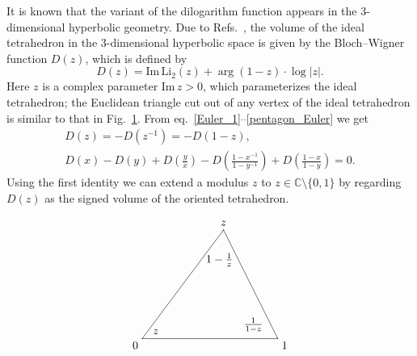 \documentclass[12pt]{article}
\numberwithin{equation}{section}
\renewcommand{\Im}{\text{Im}}
\newcommand{\Li}{\mathrm{Li}_2}
\begin{document}
It is known that the variant of the dilogarithm function appears in
the 3-dimensional hyperbolic geometry.
Due to Refs.~, the  volume of the
ideal tetrahedron in
the 3-dimensional hyperbolic space is given by the Bloch--Wigner
function $D(z)$, which is defined by
\begin{equation}
  \label{Bloch_Wigner}
  D(z)
  = \Im \, \Li(z) + \arg(1-z) \cdot \log |z| .
\end{equation}
Here $z$ is a complex parameter $\Im \, z >0$,
which parameterizes the ideal tetrahedron;
the Euclidean triangle cut out of any vertex of the ideal tetrahedron
is similar to that in Fig.~\ref{fig:triangle}.
{}From eq.~\eqref{Euler_1}--\eqref{pentagon_Euler}  we get
\begin{subequations}
  \label{Bloch_relation}
  \begin{gather}
    D(z)
    =
    -D(z^{-1})
    = - D(1-z)
    ,
    \\[2mm]
%
    D(x) - D(y) + D(\frac{y}{x})
    - D(\frac{1 - x^{-1}}{1 - y^{-1}})
    + D(\frac{1 - x}{1- y})
    = 0 .
  \end{gather}
\end{subequations}
Using the first identity
we can extend a modulus $z$ to  $z\in\mathbb{C} \setminus \{0,1\}$
by regarding
$D(z)$ as the signed
volume of the oriented tetrahedron.

\begin{figure}[htbp]
  \centering
  \begin{equation*}
    \xy/r1.0pc/:.
    {
      { (0,0) \ar@{-} (10,0) },
      { (0,0) \ar@{-} (6,8) },
      { (10,0) \ar@{-} (6,8) },
%
      { (-0.5,-0.5)*+{0} },
      { (10.5,-0.5)*+{1} },
      { (6,8.5)*+{z} },
%
      { (1,0.5)*+{z} },
      { (8.2,1)*+{\frac{1}{1-z}} },
      { (5.7,5.8)*+{{1-\frac{1}{z}}} },
      }
    \endxy
  \end{equation*}
  \caption{}
  \label{fig:triangle}
\end{figure}
\end{document}
